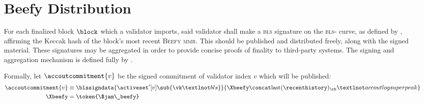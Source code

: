 \section{Beefy Distribution}
\label{sec:beefy}

For each finalized block $\block$ which a validator imports, said validator shall make a \textsc{bls} signature on the \textsc{bls}- curve, as defined by \cite{bls12-381}, affirming the Keccak hash of the block's most recent \textsc{Beefy} \textsc{mmr}. This should be published and distributed freely, along with the signed material. These signatures may be aggregated in order to provide concise proofs of finality to third-party systems. The signing and aggregation mechanism is defined fully by \cite{cryptoeprint:2022/1611}.

Formally, let $\accoutcommitment{v}$ be the signed commitment of validator index $v$ which will be published:
\begin{align}\label{eq:accoutsignedcommitment}
  \accoutcommitment{v} &\equiv \blssigndata{\activeset'[\mathnormal{v}]\sub{\vk¬bls}}{\Xbeefy \concat \text{last}(\recenthistory)_\rh¬accoutlogsuperpeak}\\
  \Xbeefy &= \token{\$jam\_beefy}
\end{align}
